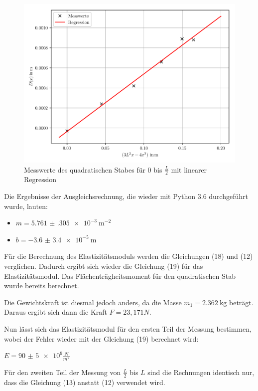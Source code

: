 \begin{figure}[H]
  \centering
  \includegraphics[width=\textwidth]{ausgleichsgerade3.pdf}
  \caption{Messwerte des quadratischen Stabes für $0$ bis $\frac{L}{2}$ mit linearer Regression}
\end{figure}

Die Ergebnisse der Ausgleichsrechnung, die wieder mit Python 3.6 durchgeführt wurde,
lauten:

\begin{itemize}
  \item $m = \SI{5.761(305)e-3}{\meter\tothe{-2}}$
  \item $b = \SI{-3.6(34)e-5}{\meter}$
\end{itemize}

Für die Berechnung des Elastizitätsmoduls werden die Gleichungen (18) und (12)
verglichen. Dadurch ergibt sich wieder die Gleichung (19) für das Elastizitätsmodul.
Das Flächenträgheitsmoment für den quadratischen Stab wurde bereits berechnet.

Die Gewichtskraft ist diesmal jedoch anders, da die Masse $m_1 = \SI{2.362}{\kilo\gram}$
beträgt. Daraus ergibt sich dann die Kraft $F = 23,171N$.

Nun lässt sich das Elastizitätsmodul für den ersten Teil der Messung bestimmen,
wobei der Fehler wieder mit der Gleichung (19) berechnet wird:

\centerline{$E = \num{90(5)e9} \frac{N}{m^2}$}

Für den zweiten Teil der Messung von $\frac{L}{2}$ bis $L$ sind die Rechnungen
identisch nur, dass die Gleichung (13) anstatt (12) verwendet wird.

